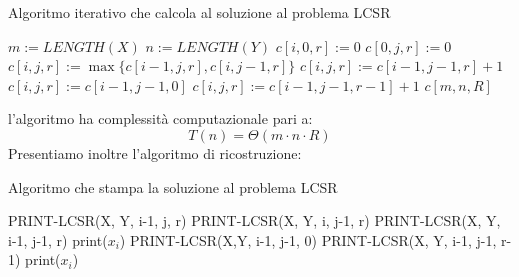 \documentclass[12pt]{article}
\begin{document}
\begin{algorithm}[H]
    \caption{Algoritmo iterativo che calcola al soluzione al problema LCSR}
    \DontPrintSemicolon
     {
        $m := LENGTH(X)$ \;
        $n := LENGTH(Y)$ \;
         {
             {
                $c[i, 0, r] := 0$
            }
        }
         {
             {
                $c[0, j, r] := 0$
            }
        }
         {
             {
                 {
                     {
                        $c[i,j,r] := \max\{c[i-1,j,r], c[i, j-1, r]\}$
                    } {
                         {
                            $c[i,j,r] := c[i-1,j-1,r] + 1$
                        } {
                             {
                                $c[i,j,r] := c[i-1,j-1,0]$
                            } {
                                $c[i,j,r] := c[i-1,j-1, r-1] +1$
                            }
                        }
                    }
                }
            }
        }
        \Return $c[m, n, R]$
    }
\end{algorithm} \noindent
l'algoritmo ha complessità computazionale pari a:
$$T(n) = \Theta(m \cdot n \cdot R)$$
\newpage \noindent
Presentiamo inoltre l'algoritmo di ricostruzione: \newline
\begin{algorithm}[H]
    \caption{Algoritmo che stampa la soluzione al problema LCSR}
    \DontPrintSemicolon
     {
         {
             {
                 {
                    PRINT-LCSR(X, Y, i-1, j, r)
                } {
                    PRINT-LCSR(X, Y, i, j-1, r)
                }
            } {
                 {
                    PRINT-LCSR(X, Y, i-1, j-1, r) \;
                    print($x_i$)
                } {
                     {
                        PRINT-LCSR(X,Y, i-1, j-1, 0)
                    } {
                        PRINT-LCSR(X, Y, i-1, j-1, r-1) \;
                        print($x_i$)
                    }
                }
            }
        }
    }
\end{algorithm} \noindent
\end{document}
